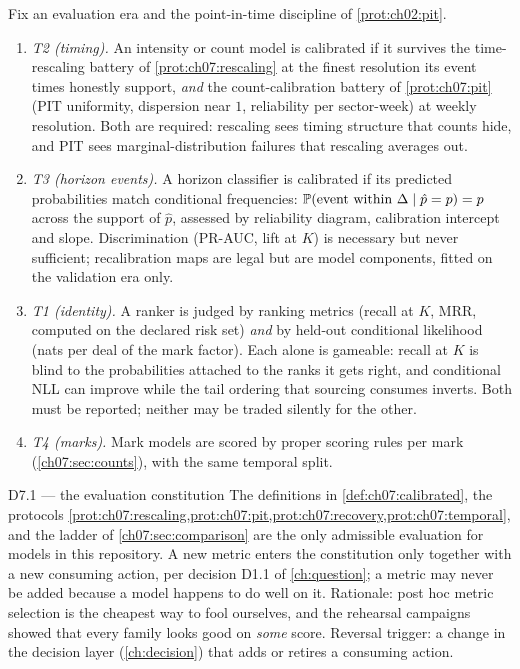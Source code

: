 \begin{definition}\label{def:ch07:calibrated}
Fix an evaluation era and the point-in-time discipline of
\cref{prot:ch02:pit}.
\begin{enumerate}[label=(\roman*)]
\item \emph{T2 (timing).} An intensity or count model is calibrated if it
survives the time-rescaling battery of \cref{prot:ch07:rescaling} at the
finest resolution its event times honestly support, \emph{and} the
count-calibration battery of \cref{prot:ch07:pit} (PIT uniformity,
dispersion near $1$, reliability per sector-week) at weekly resolution.
Both are required: rescaling sees timing structure that counts hide, and
PIT sees marginal-distribution failures that rescaling averages out.
\item \emph{T3 (horizon events).} A horizon classifier is calibrated if its
predicted probabilities match conditional frequencies:
$\mathbb{P}(\text{event within } \Delta \mid \hat p = p) = p$ across the
support of $\hat p$, assessed by reliability diagram, calibration
intercept and slope. Discrimination (PR-AUC, lift at $K$) is necessary
but never sufficient; recalibration maps
\citep{platt1999,zadroznyelkan2002,niculescumizil2005} are legal but are
model components, fitted on the validation era only.
\item \emph{T1 (identity).} A ranker is judged by ranking metrics
(recall at $K$, MRR, computed on the declared risk set) \emph{and} by
held-out conditional likelihood (nats per deal of the mark factor). Each
alone is gameable: recall at $K$ is blind to the probabilities attached to
the ranks it gets right, and conditional NLL can improve while the tail
ordering that sourcing consumes inverts. Both must be reported; neither
may be traded silently for the other.
\item \emph{T4 (marks).} Mark models are scored by proper scoring rules per
mark (\cref{ch07:sec:counts}), with the same temporal split.
\end{enumerate}
\end{definition}

\begin{decision}{D7.1 --- the evaluation constitution}
The definitions in \cref{def:ch07:calibrated}, the protocols
\cref{prot:ch07:rescaling,prot:ch07:pit,prot:ch07:recovery,prot:ch07:temporal},
and the ladder of \cref{ch07:sec:comparison} are the only admissible
evaluation for models in this repository. A new metric enters the
constitution only together with a new consuming action, per decision D1.1
of \cref{ch:question}; a metric may never be added because a model
happens to do well on it. Rationale: post hoc metric selection is the
cheapest way to fool ourselves, and the rehearsal campaigns showed that
every family looks good on \emph{some} score. Reversal trigger: a change
in the decision layer (\cref{ch:decision}) that adds or retires a
consuming action.
\end{decision}

